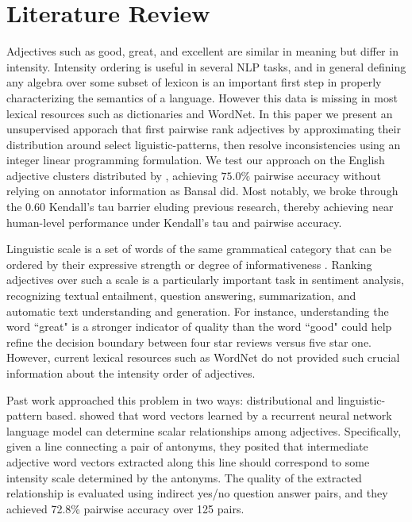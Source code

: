 \section{Literature Review}

Adjectives such as good, great, and excellent are similar in meaning but differ in intensity. Intensity ordering is useful in several NLP tasks, and in general defining any algebra over some subset of lexicon is an important first step in properly characterizing the semantics of a language. However this data is missing in most lexical resources such as dictionaries and WordNet. In this paper we present an unsupervised apporach that first pairwise rank adjectives by approximating their distribution around select liguistic-patterns, then resolve inconsistencies using an integer linear programming formulation. We test our approach on the English adjective clusters distributed by , achieving $75.0\%$ pairwise accuracy without relying on annotator information as Bansal did. Most notably, we broke through the $0.60$ Kendall's tau barrier eluding previous research, thereby achieving near human-level performance under Kendall's tau and pairwise accuracy.

Linguistic scale is a set of words of the same grammatical category that can be ordered by their expressive strength or degree of informativeness \cite{sheinman2009adjscales}. Ranking adjectives over such a scale is a particularly important task in sentiment analysis, recognizing textual entailment, question answering, summarization, and automatic text understanding and generation. For instance, understanding the word ``great" is a stronger indicator of quality than the word ``good" could help refine the decision boundary between four star reviews versus five star one. However, current lexical resources such as WordNet do not provided such crucial information about the intensity order of adjectives.

Past work approached this problem in two ways: distributional and linguistic-pattern based.  showed that word vectors learned by a recurrent neural network language model can determine scalar relationships among adjectives. Specifically, given a line connecting a pair of antonyms, they posited that intermediate adjective word vectors extracted along this line should correspond to some intensity scale determined by the antonyms. The quality of the extracted relationship is evaluated using indirect yes/no question answer pairs, and they achieved 72.8\% pairwise accuracy over 125 pairs.

